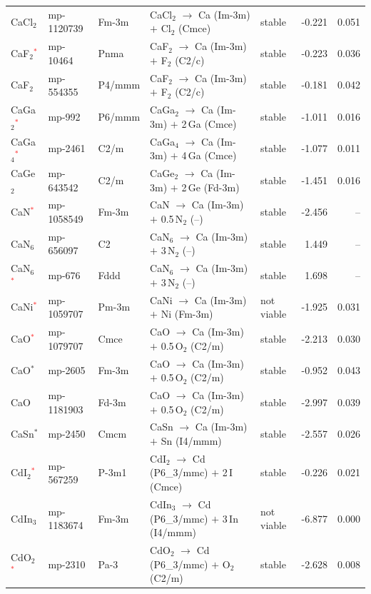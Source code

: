 \begin{longtable}{@{}ll l@{\hspace{4pt}} p{4.6cm} l@{\hspace{4pt}} rr@{}}
CaCl$_{2}$ & mp-1120739 & Fm-3m & CaCl$_{2}$ $\to$ Ca (Im-3m) $+$ Cl$_{2}$ (Cmce) & stable & -0.221 & 0.051 \\
CaF$_{2}$\textcolor{red}{$^*$} & mp-10464 & Pnma & CaF$_{2}$ $\to$ Ca (Im-3m) $+$ F$_{2}$ (C2/c) & stable & -0.223 & 0.036 \\
CaF$_{2}$ & mp-554355 & P4/mmm & CaF$_{2}$ $\to$ Ca (Im-3m) $+$ F$_{2}$ (C2/c) & stable & -0.181 & 0.042 \\
CaGa$_{2}$\textcolor{red}{$^*$} & mp-992 & P6/mmm & CaGa$_{2}$ $\to$ Ca (Im-3m) $+$ 2\,Ga (Cmce) & stable & -1.011 & 0.016 \\
CaGa$_{4}$\textcolor{red}{$^*$} & mp-2461 & C2/m & CaGa$_{4}$ $\to$ Ca (Im-3m) $+$ 4\,Ga (Cmce) & stable & -1.077 & 0.011 \\
CaGe$_{2}$ & mp-643542 & C2/m & CaGe$_{2}$ $\to$ Ca (Im-3m) $+$ 2\,Ge (Fd-3m) & stable & -1.451 & 0.016 \\
CaN\textcolor{red}{$^*$} & mp-1058549 & Fm-3m & CaN $\to$ Ca (Im-3m) $+$ 0.5\,N$_{2}$ (--) & stable & -2.456 & -- \\
CaN$_{6}$ & mp-656097 & C2 & CaN$_{6}$ $\to$ Ca (Im-3m) $+$ 3\,N$_{2}$ (--) & stable & 1.449 & -- \\
CaN$_{6}$\textcolor{red}{$^*$} & mp-676 & Fddd & CaN$_{6}$ $\to$ Ca (Im-3m) $+$ 3\,N$_{2}$ (--) & stable & 1.698 & -- \\
CaNi\textcolor{red}{$^*$} & mp-1059707 & Pm-3m & CaNi $\to$ Ca (Im-3m) $+$ Ni (Fm-3m) & not viable & -1.925 & 0.031 \\
CaO\textcolor{red}{$^*$} & mp-1079707 & Cmce & CaO $\to$ Ca (Im-3m) $+$ 0.5\,O$_{2}$ (C2/m) & stable & -2.213 & 0.030 \\
CaO$^*$ & mp-2605 & Fm-3m & CaO $\to$ Ca (Im-3m) $+$ 0.5\,O$_{2}$ (C2/m) & stable & -0.952 & 0.043 \\
CaO & mp-1181903 & Fd-3m & CaO $\to$ Ca (Im-3m) $+$ 0.5\,O$_{2}$ (C2/m) & stable & -2.997 & 0.039 \\
CaSn$^*$ & mp-2450 & Cmcm & CaSn $\to$ Ca (Im-3m) $+$ Sn (I4/mmm) & stable & -2.557 & 0.026 \\
CdI$_{2}$\textcolor{red}{$^*$} & mp-567259 & P-3m1 & CdI$_{2}$ $\to$ Cd (P6\_3/mmc) $+$ 2\,I (Cmce) & stable & -0.226 & 0.021 \\
CdIn$_{3}$ & mp-1183674 & Fm-3m & CdIn$_{3}$ $\to$ Cd (P6\_3/mmc) $+$ 3\,In (I4/mmm) & not viable & -6.877 & 0.000 \\
CdO$_{2}$\textcolor{red}{$^*$} & mp-2310 & Pa-3 & CdO$_{2}$ $\to$ Cd (P6\_3/mmc) $+$ O$_{2}$ (C2/m) & stable & -2.628 & 0.008 \\

\end{longtable}
